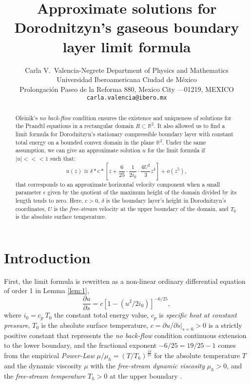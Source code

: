 \documentclass{article}
\title{Approximate solutions for Dorodnitzyn's gaseous boundary layer limit formula}
\author{
  Carla V.~Valencia-Negrete
Department of Physics and Mathematics\\
Universidad Iberoamericana Ciudad de M\'{e}xico\\
  Prolongaci\'{o}n Paseo de la Reforma 880,  Mexico City ---01219, MEXICO \\
  \texttt{carla.valencia@ibero.mx} 
}
\begin{document}
\maketitle

\begin{abstract}
Oleinik's \emph{no back-flow} condition ensures the existence and uniqueness of 
solutions for the Prandtl equations in a rectangular domain $R\subset \mathbb{R}^2$.
It also allowed us to find a limit formula
for Dorodnitzyn's stationary compre\-ssible boundary layer with constant total energy
on a bounded convex domain in the plane $\mathbb{R}^2$.
Under the same assumption, we can give an approximate solution $u$ for the limit formula
if $|u|<\!\!<\!\!<1$ such that:
\[u(z)\cong \delta * c *
\left[z+\frac{6}{25}\cdot \frac{1}{2i_0} \cdot \frac{4U^2}{3}z^4\right]+o(z^5),\]
that corresponds to an approximate horizontal velocity component
when a small parameter $\epsilon$ given by the quotient of the maximum height
of the domain divided by its length tends to zero.
Here, $c>0$, $\delta$ is the boundary layer's height in Dorodnitzyn's coordinates,
$U$ is the \emph{free-stream} velocity at the upper boundary of the domain, and 
$T_0$ is the absolute surface temperature.
\end{abstract}




\section{Introduction}
\label{sec:1}

First, the limit formula is rewritten as a non-linear 
ordinary differential equation of order 1 in Lemma \ref{lem:1},
\[\frac{\partial u}{\partial s}
=c\left[1-\left(u^2/2i_0\right)\right]^{-6/25},\]
where  $i_0=c_p \ T_0$ the constant total energy value,
$c_p$ is \emph{specific heat at cons\-tant}
\emph{pressure}, $T_0$ is the absolute surface temperature,
$c=\left. \partial u/\partial s\right|_{s=0}>0$ is a strictly positive constant
that represents the \emph{no back-flow} condition continuous extension to the lower boundary,
and the fractional exponent $-6/25=19/25-1$ comes from the 
empirical \emph{Power-Law} 
$\mu/\mu_h  =   \left( T/T_h\right)^{\frac{19}{25}}$
for the absolute temperature $T$ and
the dynamic viscosity $\mu$ 
with the \emph{free-stream dynamic viscosity} $\mu_h>0$,
and the \emph{free-stream temperature} $T_h>0$
at the upper boundary \cite[p. 46]{SmitsDussauge2006}.
\end{document}
